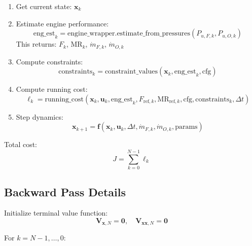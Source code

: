 \documentclass[11pt,a4paper]{article}
\begin{document}
\begin{enumerate}
    \item Get current state: $\mathbf{x}_k$
    \item Estimate engine performance:
    \begin{equation}
    \text{eng\_est}_k = \text{engine\_wrapper.estimate\_from\_pressures}(P_{u,F,k}, P_{u,O,k})
    \end{equation}
    This returns: $F_k$, $\text{MR}_k$, $\dot{m}_{F,k}$, $\dot{m}_{O,k}$
    
    \item Compute constraints:
    \begin{equation}
    \text{constraints}_k = \text{constraint\_values}(\mathbf{x}_k, \text{eng\_est}_k, \text{cfg})
    \end{equation}
    
    \item Compute running cost:
    \begin{equation}
    \ell_k = \text{running\_cost}(\mathbf{x}_k, \mathbf{u}_k, \text{eng\_est}_k, F_{\text{ref},k}, \text{MR}_{\text{ref},k}, \text{cfg}, \text{constraints}_k, \Delta t)
    \end{equation}
    
    \item Step dynamics:
    \begin{equation}
    \mathbf{x}_{k+1} = \mathbf{f}(\mathbf{x}_k, \mathbf{u}_k, \Delta t, \dot{m}_{F,k}, \dot{m}_{O,k}, \text{params})
    \end{equation}
\end{enumerate}

Total cost:
\begin{equation}
J = \sum_{k=0}^{N-1} \ell_k
\end{equation}

\subsection{Backward Pass Details}

Initialize terminal value function:
\begin{equation}
\mathbf{V}_{\mathbf{x},N} = \mathbf{0}, \quad \mathbf{V}_{\mathbf{xx},N} = \mathbf{0}
\end{equation}

For $k = N-1, \ldots, 0$:
\end{document}
